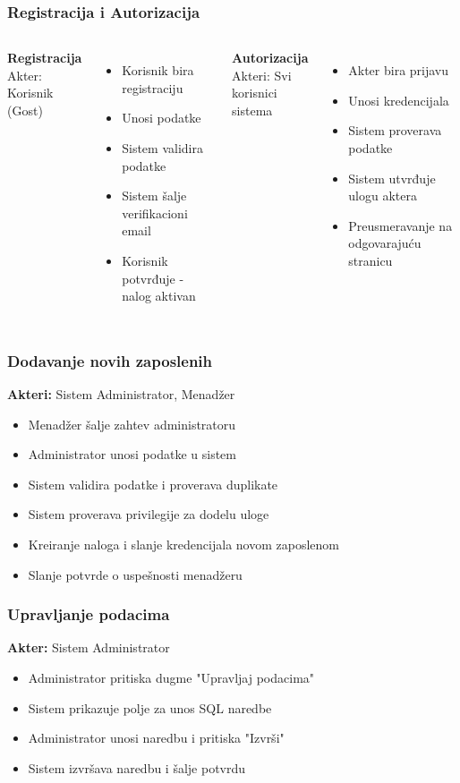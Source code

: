 \documentclass{beamer}
\begin{document}
\begin{frame}
\frametitle{Registracija i Autorizacija}
\begin{columns}[t]
\textbf{Registracija}\\
{\small Akter: Korisnik (Gost)}
\begin{itemize}
\item Korisnik bira registraciju
\item Unosi podatke
\item Sistem validira podatke
\item Sistem šalje verifikacioni email
\item Korisnik potvrđuje - nalog aktivan
\end{itemize}

\textbf{Autorizacija}\\
{\small Akteri: Svi korisnici sistema}
\begin{itemize}
\item Akter bira prijavu
\item Unosi kredencijala
\item Sistem proverava podatke
\item Sistem utvrđuje ulogu aktera
\item Preusmeravanje na odgovarajuću stranicu
\end{itemize}
\end{columns}
\end{frame}

\begin{frame}
\frametitle{Dodavanje novih zaposlenih}
\textbf{Akteri:} Sistem Administrator, Menadžer

\vspace{8pt}
\begin{itemize}
\item Menadžer šalje zahtev administratoru
\item Administrator unosi podatke u sistem 
\item Sistem validira podatke i proverava duplikate
\item Sistem proverava privilegije za dodelu uloge
\item Kreiranje naloga i slanje kredencijala novom zaposlenom
\item Slanje potvrde o uspešnosti menadžeru
\end{itemize}
\end{frame}

\begin{frame}
\frametitle{Upravljanje podacima}
\textbf{Akter:} Sistem Administrator

\vspace{8pt}
\begin{itemize}
\item Administrator pritiska dugme "Upravljaj podacima"
\item Sistem prikazuje polje za unos SQL naredbe
\item Administrator unosi naredbu i pritiska "Izvrši"
\item Sistem izvršava naredbu i šalje potvrdu
\end{itemize}
\end{frame}
\end{document}
